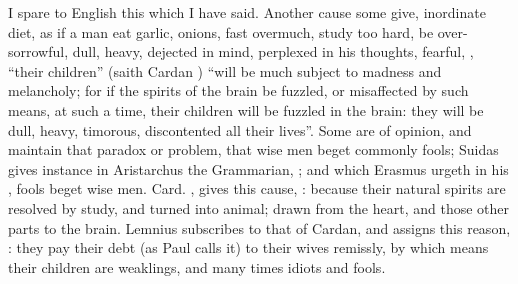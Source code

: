 \etc{} I spare to English this which I have said. Another cause some give,
inordinate diet, as if a man eat garlic, onions, fast overmuch, study too hard,
be over-sorrowful, dull, heavy, dejected in mind, perplexed in his thoughts,
fearful, \etc{}, \enquote{their children} (saith Cardan
) \enquote{will be much subject to madness and
melancholy; for if the spirits of the brain be fuzzled, or misaffected by such
means, at such a time, their children will be fuzzled in the brain: they will
be dull, heavy, timorous, discontented all their lives}. Some are of opinion,
and maintain that paradox or problem, that wise men beget commonly fools;
Suidas gives instance in Aristarchus the Grammarian, ; and which
Erasmus urgeth in his , fools
beget wise men. Card. , gives this cause,
: because their natural spirits are resolved by study, and turned into
animal; drawn from the heart, and those other parts to the brain. Lemnius
subscribes to that of Cardan, and assigns this reason, : they pay their debt (as Paul calls it) to their wives remissly, by
which means their children are weaklings, and many times idiots and fools.

